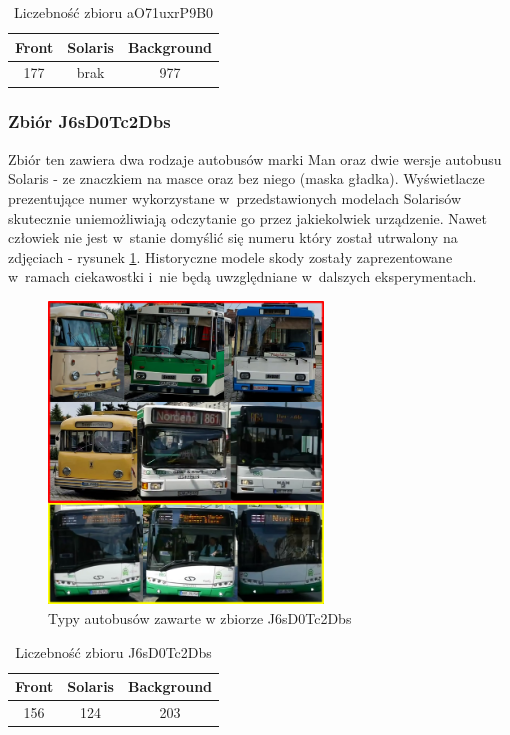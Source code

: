\begin{table}[!h]
    \centering
    \begin{tabular}{c|c|c}
        Front   & Solaris   & Background \\ \hline
        177     & brak      & 977 
    \end{tabular}
    \caption{Liczebność zbioru aO71uxrP9B0}
    \label{tab:aO71uxrP9B0_count}
\end{table}

\newpage

\subsubsection{Zbiór J6sD0Tc2Dbs}

Zbiór ten zawiera dwa rodzaje autobusów marki Man oraz dwie wersje autobusu
Solaris - ze znaczkiem na masce oraz bez niego (maska gładka). Wyświetlacze
prezentujące numer wykorzystane w~przedstawionych modelach Solarisów
skutecznie uniemożliwiają odczytanie go przez jakiekolwiek urządzenie. 
Nawet człowiek nie jest w~stanie domyślić się numeru który został utrwalony
na zdjęciach - rysunek \ref{fig:J6sD0Tc2Dbs_types}. Historyczne modele
skody zostały zaprezentowane w~ramach ciekawostki i~nie będą uwzględniane
w~dalszych eksperymentach.

\begin{figure}[!h]
    \centering
    \includegraphics[width=0.65\textwidth]{img/exp_trainig_data_J6s}
    \caption{Typy autobusów zawarte w zbiorze J6sD0Tc2Dbs}
    \label{fig:J6sD0Tc2Dbs_types}
\end{figure}

\begin{table}[!h]
    \centering
    \begin{tabular}{c|c|c}
        Front   & Solaris   & Background \\ \hline
        156     & 124       & 203 
    \end{tabular}
    \caption{Liczebność zbioru J6sD0Tc2Dbs}
    \label{tab:J6sD0Tc2Dbs_count}
\end{table}


